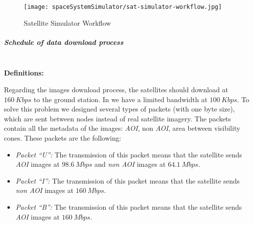 \begin{figure}[!h]
\begin{center}
\texttt{[image: spaceSystemSimulator/sat-simulator-workflow.jpg]}
\caption{Satellite Simulator Workflow}
\label{fig:sss-sat-simulator-workflow}
\end{center}
\end{figure}

\subparagraph{Schedule of data download process}~\\
\label{subpar:shedule-process}
\textbf{Definitions:}

Regarding the images download process, the satellites should download at
$160~Kbps$ to the ground station. In \vw we have a limited bandwidth at
$100~Kbps$. To solve this problem we designed several types of packets (with one
byte size), which are sent between \vw nodes instead of real satellite
imagery. The packets contain all the metadata of the images: \emph{AOI}, non \emph{AOI}, area
between visibility cones.  These packets are the following:
\begin{itemize}
\item \emph{Packet ``U'':} The transmission of this packet means that the satellite sends \emph{AOI} images at $98.6~Mbps$ and \emph{non AOI} images at $64.1~Mbps$.
\item \emph{Packet ``I'':} The transmission of this packet means that the satellite sends \emph{non AOI} images at $160~Mbps$.
\item \emph{Packet ``B'':} The transmission of this packet means that the
  satellite sends \emph{AOI} images at $160~Mbps$.
\end{itemize}

